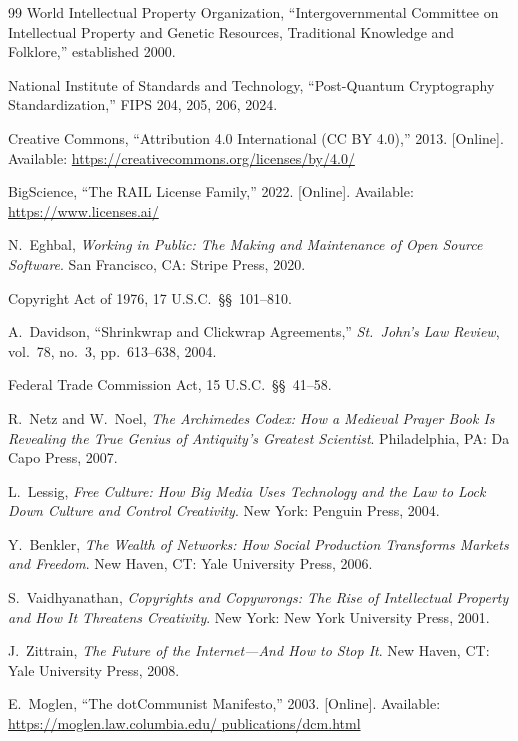 \documentclass[11pt,twocolumn]{article}
\begin{document}
\begin{thebibliography}{99}
World Intellectual Property Organization, ``Intergovernmental Committee
on Intellectual Property and Genetic Resources, Traditional Knowledge
and Folklore,'' established 2000.

National Institute of Standards and Technology, ``Post-Quantum
Cryptography Standardization,'' FIPS 204, 205, 206, 2024.

Creative Commons, ``Attribution 4.0 International (CC BY 4.0),'' 2013.
[Online]. Available: \url{https://creativecommons.org/licenses/by/4.0/}

BigScience, ``The RAIL License Family,'' 2022.
[Online]. Available: \url{https://www.licenses.ai/}

N.~Eghbal, \emph{Working in Public: The Making and Maintenance of Open
Source Software}. San Francisco, CA: Stripe Press, 2020.

Copyright Act of 1976, 17 U.S.C.\ \S\S~101--810.

A.~Davidson, ``Shrinkwrap and Clickwrap Agreements,'' \emph{St.\ John's
Law Review}, vol.~78, no.~3, pp.~613--638, 2004.

Federal Trade Commission Act, 15 U.S.C.\ \S\S~41--58.

R.~Netz and W.~Noel, \emph{The Archimedes Codex: How a Medieval Prayer
Book Is Revealing the True Genius of Antiquity's Greatest Scientist}.
Philadelphia, PA: Da Capo Press, 2007.

L.~Lessig, \emph{Free Culture: How Big Media Uses Technology and the
Law to Lock Down Culture and Control Creativity}. New York: Penguin
Press, 2004.

Y.~Benkler, \emph{The Wealth of Networks: How Social Production
Transforms Markets and Freedom}. New Haven, CT: Yale University Press,
2006.

S.~Vaidhyanathan, \emph{Copyrights and Copywrongs: The Rise of
Intellectual Property and How It Threatens Creativity}. New York: New
York University Press, 2001.

J.~Zittrain, \emph{The Future of the Internet---And How to Stop It}.
New Haven, CT: Yale University Press, 2008.

E.~Moglen, ``The dotCommunist Manifesto,'' 2003.
[Online]. Available: \url{https://moglen.law.columbia.edu/
publications/dcm.html}


\end{thebibliography}
\end{document}
